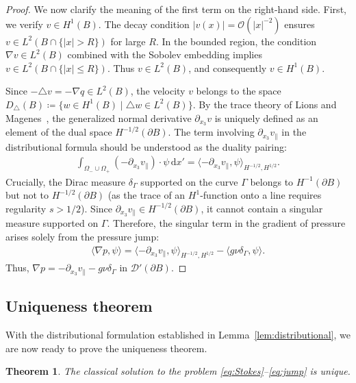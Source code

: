 \documentclass{article}
\newtheorem{theorem}{Theorem}[section]
\theoremstyle{remark}
\theoremstyle{definition}
\numberwithin{equation}{section}
\begin{document}
\begin{proof}
    We now clarify the meaning of the first term on the right-hand side.
    First, we verify $v \in H^1(B)$. 
    The decay condition $|v(x)| = \mathcal{O}(|x|^{-2})$ ensures $v \in L^2(B \cap \{|x|>R\})$ for large $R$.
    In the bounded region, the condition $\nabla v \in L^2(B)$ combined with the Sobolev embedding implies $v \in L^2(B \cap \{|x|\le R\})$. Thus $v \in L^2(B)$, and consequently $v \in H^1(B)$.
    
    Since $-\triangle v = -\nabla q \in L^2(B)$, the velocity $v$ belongs to the space $D_\triangle(B) \coloneqq \{w \in H^1(B) \mid \triangle w \in L^2(B)\}$.
    By the trace theory of Lions and Magenes~\cite[Theorem~6.5 in Chapter~2, Section~6.5]{lions1972non}, the generalized normal derivative $\partial_{x_3}v$ is uniquely defined as an element of the dual space $H^{-1/2}(\partial B)$.
    The term involving $\partial_{x_3}v_\parallel$ in the distributional formula should be understood as the duality pairing:
    \begin{align*}
        \int_{\Omega_-\cup\Omega_+} (-\partial_{x_3}v_\parallel) \cdot \psi\,\mathrm{d}x' = \langle -\partial_{x_3}v_\parallel, \psi \rangle_{H^{-1/2}, H^{1/2}}.
    \end{align*}
    Crucially, the Dirac measure $\delta_\Gamma$ supported on the curve $\Gamma$ belongs to $H^{-1}(\partial B)$ but not to $H^{-1/2}(\partial B)$ (as the trace of an $H^1$-function onto a line requires regularity $s > 1/2$).
    Since $\partial_{x_3}v_\parallel \in H^{-1/2}(\partial B)$, it cannot contain a singular measure supported on $\Gamma$.
    Therefore, the singular term in the gradient of pressure arises solely from the pressure jump:
    \begin{align*}
        \langle \nabla p, \psi \rangle = \langle -\partial_{x_3}v_\parallel, \psi \rangle_{H^{-1/2}, H^{1/2}} - \langle g\nu\delta_\Gamma, \psi \rangle.
    \end{align*}
    Thus, $\nabla p = -\partial_{x_3}v_\parallel - g\nu\delta_\Gamma$ in $\mathcal{D}'(\partial B)$.
\end{proof}


\subsection{Uniqueness theorem}

With the distributional formulation established in Lemma~\ref{lem:distributional}, we are now ready to prove the uniqueness theorem.

\begin{theorem}
    \label{thm:uniqueness}
    The classical solution to the problem \eqref{eq:Stokes}--\eqref{eq:jump} is unique.
\end{theorem}
\end{document}
